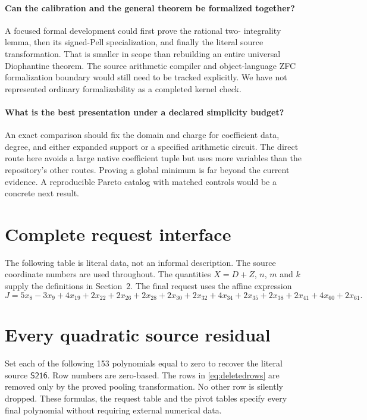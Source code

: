 \documentclass[10pt,letterpaper]{article}
\theoremstyle{remark}\newtheorem{remark}[theorem]{Remark}
\newcommand{\src}{\textsf{S216}}
\begin{document}
\paragraph{Can the calibration and the general theorem be formalized together?}
A focused formal development could first prove the rational two-
integrality lemma, then its signed-Pell specialization, and finally the
literal source transformation. That is smaller in scope than rebuilding
an entire universal Diophantine theorem. The source arithmetic compiler
and object-language ZFC formalization boundary would still need to be
tracked explicitly. We have not represented ordinary formalizability
as a completed kernel check.

\paragraph{What is the best presentation under a declared simplicity budget?}
An exact comparison should fix the domain and charge for coefficient
data, degree, and either expanded support or a specified arithmetic
circuit. The direct route here avoids a large native coefficient tuple
but uses more variables than the repository's other routes. Proving a
global minimum is far beyond the current evidence. A reproducible
Pareto catalog with matched controls would be a concrete next result.

\appendix
\section{Complete request interface}\label{app:requests}
The following table is literal data, not an informal description.
The source coordinate numbers are used throughout. The quantities
$X=D+Z$, $n$, $m$ and $k$ supply the definitions in Section~2.
The final request uses the affine expression
\[
 J=5x_8-3x_9+4x_{19}+2x_{22}+2x_{26}+2x_{28}+2x_{30}
 +2x_{32}+4x_{34}+2x_{35}+2x_{38}+2x_{41}+4x_{60}+2x_{61}.
\]


\section{Every quadratic source residual}\label{app:rows}
Set each of the following 153 polynomials equal to zero to recover the
literal source $\src$. Row numbers are zero-based. The rows in
\eqref{eq:deletedrows} are removed only by the proved pooling
transformation. No other row is silently dropped. These formulas,
the request table and the pivot tables specify every final polynomial
without requiring external numerical data.

\end{document}
